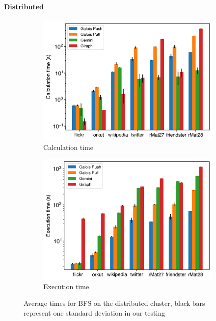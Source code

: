 \paragraph{Distributed}
\begin{figure}
	\hfil
	\begin{subfigure}{0.32\textwidth}
		\includegraphics[width=\linewidth]{../../plots/distributedBFS_calcTime.png}
		\caption{Calculation time}
		\label{fig:distributedBFS_calc}
	\end{subfigure}
	\hfil
	\begin{subfigure}{0.32\textwidth}
		\includegraphics[width=\linewidth]{../../plots/distributedBFS_execTime.png}
		\caption{Execution time}
		\label{fig:distributedBFS_exec}
	\end{subfigure}
	\hfil
	\caption{Average times for BFS on the distributed cluster, black bars represent one standard deviation in our testing}
	\label{fig:distributedBFS}
\end{figure}

